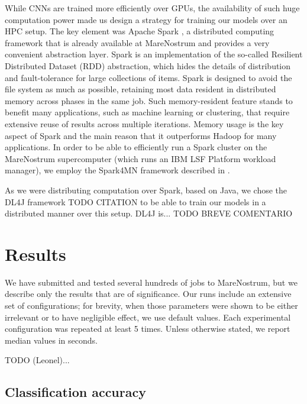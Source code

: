 \documentclass[smallextended]{svjour3}       %
\begin{document}
While CNNs are trained more efficiently over GPUs, the availability of such huge computation power made us design a strategy for training our models over an HPC setup. The key element was Apache Spark \cite{zaharia2012}, a distributed computing framework that is already available at MareNostrum and provides a very convenient abstraction layer. Spark is an implementation of the so-called Resilient Distributed Dataset (RDD) abstraction, which hides the details of distribution and fault-tolerance for large collections of items. Spark is designed to avoid the file system as much as possible, retaining most data resident in distributed memory across phases in the same job. Such memory-resident feature stands to benefit many applications, such as machine learning or clustering, that require extensive reuse of results across multiple iterations. Memory usage is the key aspect of Spark and the main reason that it outperforms Hadoop for many applications. In order to be able to efficiently run a Spark cluster on the MareNostrum supercomputer (which runs an IBM LSF Platform workload manager), we employ the Spark4MN framework described in \cite{conf/bigdataconf/TousGTTGALBCV15}. 

As we were distributing computation over Spark, based on Java, we chose the DL4J framework TODO CITATION to be able to train our models in a distributed manner over this setup. DL4J is... TODO BREVE COMENTARIO




%
\section{Results}
%
We have submitted and tested several hundreds of jobs to MareNostrum, but we describe only the results that are of significance. Our runs include an extensive  set of configurations; for brevity, when those parameters were shown to be either irrelevant or to have negligible effect, we use default values. Each experimental configuration was repeated at least 5 times. Unless otherwise stated, we report median values in seconds. 

TODO (Leonel)...

\subsection{Classification accuracy}
%
\end{document}
